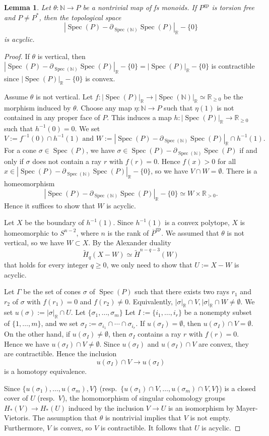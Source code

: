\documentclass[10pt]{amsart}
\newtheorem{lem}[thm]{Lemma}
\theoremstyle{definition}
\theoremstyle{remark}
\numberwithin{equation}{subsection}
\newcommand{\N}{\mathbb{N}}
\newcommand{\R}{\mathbb{R}}
\DeclareMathOperator{\Spec}{Spec}
\newcommand{\ol}{\overline}
\newcommand{\gp}{\mathrm{gp}}
\begin{document}
\begin{lem}
\label{lemma.16}
Let $\theta\colon \N\to P$ be a nontrivial map of fs monoids.
If $P^\gp$ is torsion free and $P\neq P^*$, then the topological space
\[
|\Spec(P)-\partial_{\Spec(\N)}\Spec(P)|_{\R}-\{0\}
\]
is acyclic.
\end{lem}
\begin{proof}
If $\theta$ is vertical, then
$|\Spec(P)-\partial_{\Spec(\N)}\Spec(P)|_{\R}-\{0\}=|\Spec(P)|_{\R}-\{0\}$ is contractible since $|\Spec(P)|_{\R}-\{0\}$ is convex.

Assume $\theta$ is not vertical.
Let $f\colon |\Spec(P)|_{\R}\to |\Spec(\N)|_{\R}\simeq \R_{\geq 0}$ be the morphism induced by $\theta$.
Choose any map $\eta\colon \N\to P$ such that $\eta(1)$ is not contained in any proper face of $P$.
This induces a map $h\colon |\Spec(P)|_{\R}\to \R_{\geq 0}$ such that $h^{-1}(0)=0$.
We set
\[
V:=f^{-1}(0)\cap h^{-1}(1)
\text{ and }
W:=|\Spec(P)-\partial_{\Spec(\N)}\Spec(P)|_{\R}\cap h^{-1}(1).
\]
For a cone $\sigma\in \Spec(P)$, we have $\sigma\in \Spec(P)-\partial_{\Spec(\N)}\Spec(P)$ if and only if $\sigma$ does not contain a ray $r$ with $f(r)=0$. 
Hence $f(x)>0$ for all $x\in |\Spec(P)-\partial_{\Spec(\N)}\Spec(P)|_{\R}-\{0\}$, so we have $V\cap W=\emptyset$.
There is a homeomorphism
\[
|\Spec(P)-\partial_{\Spec(\N)}\Spec(P)|_{\R}-\{0\}
\simeq
W\times \R_{>0}.
\]
Hence it suffices to show that $W$ is acyclic.

Let $X$ be the boundary of $h^{-1}(1)$.
Since $h^{-1}(1)$ is a convex polytope, $X$ is homeomorphic to $S^{n-2}$, where $n$ is the rank of $\ol{P}^\gp$.
We assumed that $\theta$ is not vertical, so we have $W\subset X$.
By the Alexander duality
\[
\tilde{H}_q(X-W)
\simeq
\tilde{H}^{n-q-3}(W)
\]
that holds for every integer $q\geq 0$, we only need to show that $U:=X-W$ is acyclic.

Let $\Gamma$ be the set of cones $\sigma$ of $\Spec(P)$ such that there exists two rays $r_1$ and $r_2$ of $\sigma$ with $f(r_1)=0$ and $f(r_2)\neq 0$.
Equivalently, $|\sigma|_{\R}\cap V,|\sigma|_{\R}\cap W\neq \emptyset$.
We set $u(\sigma):=|\sigma|_{\R}\cap U$.
Let $\{\sigma_1,\ldots,\sigma_m\}$ Let $I:=\{i_1,\ldots,i_r\}$ be a nonempty subset of $\{1,\ldots,m\}$, and we set $\sigma_I:=\sigma_{i_1}\cap \cdots \cap \sigma_{i_r}$.
If $u(\sigma_I)=\emptyset$, then $u(\sigma_I)\cap V=\emptyset$.
On the other hand, if $u(\sigma_I)\neq \emptyset$, then $\sigma_I$ contains a ray $r$ with $f(r)=0$.
Hence we have $u(\sigma_I)\cap V\neq \emptyset$.
Since $u(\sigma_I)$ and $u(\sigma_I)\cap V$ are convex, they are contractible.
Hence the inclusion
\[
u(\sigma_I)\cap V
\to
u(\sigma_I)
\]
is a homotopy equivalence.

Since 
$\{u(\sigma_1),\ldots,u(\sigma_m),V\}$ (resp.\ $\{u(\sigma_1)\cap V,\ldots,u(\sigma_m)\cap V,V\}$) is a closed cover of $U$ (resp.\ $V$), the homomorphism of singular cohomology groups $H_*(V)\to H_*(U)$ induced by the inclusion $V\to U$ is an isomorphism by 
Mayer-Vietoris.
The assumption that $\theta$ is nontrivial implies that $V$ is not empty.
Furthermore, $V$ is convex, so $V$ is contractible.
It follows that $U$ is acyclic.
\end{proof}
\end{document}
